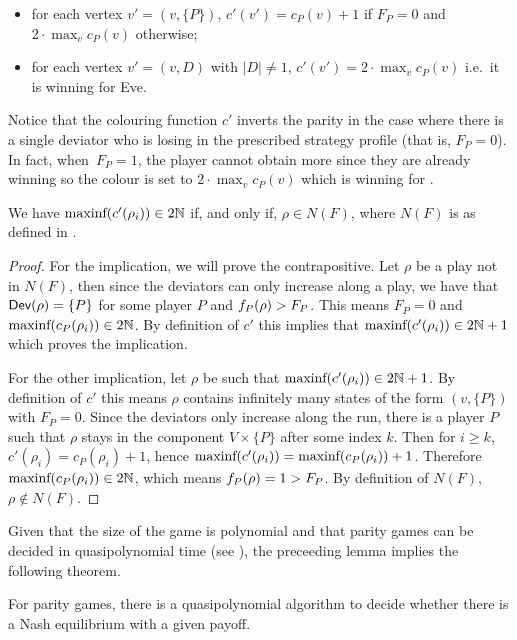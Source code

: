 \begin{itemize}
\item   for each vertex \(v' = (v, \{ P \})\), \(c'(v') = c_P(v) + 1\) if
  \(F_P = 0\) and \(2 \cdot \max_v c_P(v) \) otherwise;
\item   for each vertex \(v' = (v, D)\) with \(|D| \ne 1\), \(c'(v') = 2 \cdot \max_v c_P(v)\)
  i.e.~it is winning for Eve.
\end{itemize}

Notice that the colouring function $c'$ inverts the parity
in the case where there is a single deviator who is losing in the
prescribed strategy profile (that is, $F_P=0$). In fact,
when~$F_P=1$, the player cannot obtain more since they are already winning
so the colour is set to $2\cdot \max_v c_P(v) $ which is winning for \Eve.

\begin{lemma}
  We have \(\text{\rm maxinf}(c'(\rho_i)) \in 2 \mathbb{N}\) if, and
  only if, \(\rho\in N(F)\),
  where $N(F)$ is as defined in .
\end{lemma}
\begin{proof} For the implication, we will prove the contrapositive.
Let \(\rho\) be a play not in \(N(F)\), then since the deviators can only
increase along a play, we have that \(\textsf{Dev}(\rho) = \{ P \}\) for some
player \(P\) and \(f_P(\rho) > F_P\). This means
\(F_P = 0\) and \(\text{\rm maxinf}(c_P(\rho_i)) \in 2 \mathbb{N}\). By
definition of \(c'\) this implies that
\(\text{\rm maxinf}(c'(\rho_i)) \in 2 \mathbb{N} + 1\) which proves the
implication.

For the other implication, let \(\rho\) be such that
\(\text{\rm maxinf}(c'(\rho_i)) \in 2 \mathbb{N} + 1\). By definition of
\(c'\) this means \(\rho\) contains infinitely many states of the form
\((v, \{P\})\) with \(F_P = 0\). Since the deviators only increase
along the run, there is a player \(P\) such that \(\rho\) stays in the
component \(V \times \{P\}\) after some index \(k\). Then for \(i\geq k\),
\(c'(\rho_i) = c_P(\rho_i)+1\), hence
\(\text{\rm maxinf}(c'(\rho_i)) = \text{\rm maxinf}(c_P(\rho_i)) + 1\).
Therefore \(\text{\rm maxinf}(c_P(\rho_i)) \in 2 \mathbb{N}\), which means
\(f_P(\rho) = 1 > F_P\). By definition of \(N(F)\),
\(\rho\not\in N(F)\).
\end{proof}

Given that the size of the game is polynomial and that parity games can
be decided in quasipolynomial time (see ), the preceeding lemma
implies the following theorem.

\begin{theorem}
For parity games, there is a quasipolynomial algorithm to decide whether there is a Nash
equilibrium with a given payoff.
\end{theorem}

